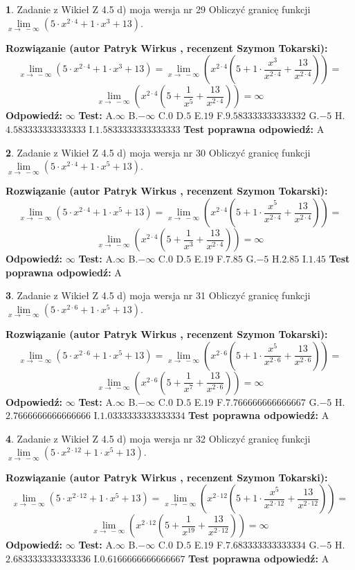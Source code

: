 \documentclass[12pt, a4paper]{article}
\theoremstyle{definition} %
\newtheorem{zad}{}
\newcommand{\zadStart}[1]{\begin{zad}#1\newline}
\newcommand{\zadStop}{\end{zad}}
\newcommand{\rozwStart}[2]{\noindent \textbf{Rozwiązanie (autor #1 , recenzent #2): }\newline}
\newcommand{\rozwStop}{\newline}
\newcommand{\odpStart}{\noindent \textbf{Odpowiedź:}\newline}
\newcommand{\odpStop}{\newline}
\newcommand{\testStart}{\noindent \textbf{Test:}\newline}
\newcommand{\testStop}{\newline}
\newcommand{\kluczStart}{\noindent \textbf{Test poprawna odpowiedź:}\newline}
\newcommand{\kluczStop}{\newline}
\begin{document}
\zadStart{Zadanie z Wikieł Z 4.5 d) moja wersja nr 29}
Obliczyć granicę funkcji  $\lim\limits_{x\to\ -\infty}(5 \cdot x^{2\cdot4}+1 \cdot x^{3}+13)$.
\zadStop
\rozwStart{Patryk Wirkus}{Szymon Tokarski}
$$\lim\limits_{x\to\ -\infty}(5 \cdot x^{2\cdot4}+1 \cdot x^{3}+13) = \lim\limits_{x\to\ -\infty}(x^{2\cdot4}(5 +1 \cdot \frac{x^{3}}{x^{2\cdot4}}+\frac{13}{x^{2\cdot4}})) =$$ $$\lim\limits_{x\to\ -\infty}(x^{2\cdot4}(5 +\frac{1}{x^{5}}+\frac{13}{x^{2\cdot4}})) =\infty$$
\rozwStop
\odpStart
$\infty$
\odpStop
\testStart
A.$\infty$ B.$-\infty$ C.$0$ D.$5$ E.$19$
F.$9.583333333333332$ G.$-5$
H.$4.583333333333333$
I.$1.5833333333333333$
\testStop
\kluczStart
A
\kluczStop



\zadStart{Zadanie z Wikieł Z 4.5 d) moja wersja nr 30}
Obliczyć granicę funkcji  $\lim\limits_{x\to\ -\infty}(5 \cdot x^{2\cdot4}+1 \cdot x^{5}+13)$.
\zadStop
\rozwStart{Patryk Wirkus}{Szymon Tokarski}
$$\lim\limits_{x\to\ -\infty}(5 \cdot x^{2\cdot4}+1 \cdot x^{5}+13) = \lim\limits_{x\to\ -\infty}(x^{2\cdot4}(5 +1 \cdot \frac{x^{5}}{x^{2\cdot4}}+\frac{13}{x^{2\cdot4}})) =$$ $$\lim\limits_{x\to\ -\infty}(x^{2\cdot4}(5 +\frac{1}{x^{3}}+\frac{13}{x^{2\cdot4}})) =\infty$$
\rozwStop
\odpStart
$\infty$
\odpStop
\testStart
A.$\infty$ B.$-\infty$ C.$0$ D.$5$ E.$19$
F.$7.85$ G.$-5$
H.$2.85$
I.$1.45$
\testStop
\kluczStart
A
\kluczStop



\zadStart{Zadanie z Wikieł Z 4.5 d) moja wersja nr 31}
Obliczyć granicę funkcji  $\lim\limits_{x\to\ -\infty}(5 \cdot x^{2\cdot6}+1 \cdot x^{5}+13)$.
\zadStop
\rozwStart{Patryk Wirkus}{Szymon Tokarski}
$$\lim\limits_{x\to\ -\infty}(5 \cdot x^{2\cdot6}+1 \cdot x^{5}+13) = \lim\limits_{x\to\ -\infty}(x^{2\cdot6}(5 +1 \cdot \frac{x^{5}}{x^{2\cdot6}}+\frac{13}{x^{2\cdot6}})) =$$ $$\lim\limits_{x\to\ -\infty}(x^{2\cdot6}(5 +\frac{1}{x^{7}}+\frac{13}{x^{2\cdot6}})) =\infty$$
\rozwStop
\odpStart
$\infty$
\odpStop
\testStart
A.$\infty$ B.$-\infty$ C.$0$ D.$5$ E.$19$
F.$7.766666666666667$ G.$-5$
H.$2.7666666666666666$
I.$1.0333333333333334$
\testStop
\kluczStart
A
\kluczStop



\zadStart{Zadanie z Wikieł Z 4.5 d) moja wersja nr 32}
Obliczyć granicę funkcji  $\lim\limits_{x\to\ -\infty}(5 \cdot x^{2\cdot12}+1 \cdot x^{5}+13)$.
\zadStop
\rozwStart{Patryk Wirkus}{Szymon Tokarski}
$$\lim\limits_{x\to\ -\infty}(5 \cdot x^{2\cdot12}+1 \cdot x^{5}+13) = \lim\limits_{x\to\ -\infty}(x^{2\cdot12}(5 +1 \cdot \frac{x^{5}}{x^{2\cdot12}}+\frac{13}{x^{2\cdot12}})) =$$ $$\lim\limits_{x\to\ -\infty}(x^{2\cdot12}(5 +\frac{1}{x^{19}}+\frac{13}{x^{2\cdot12}})) =\infty$$
\rozwStop
\odpStart
$\infty$
\odpStop
\testStart
A.$\infty$ B.$-\infty$ C.$0$ D.$5$ E.$19$
F.$7.683333333333334$ G.$-5$
H.$2.6833333333333336$
I.$0.6166666666666667$
\testStop
\kluczStart
A
\kluczStop
\end{document}

